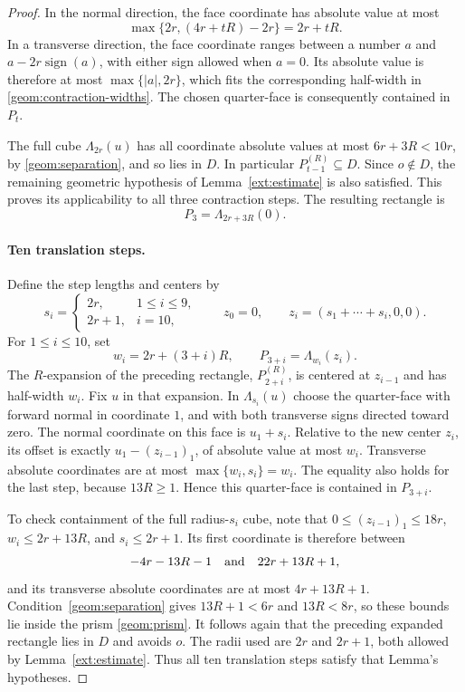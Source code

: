 \begin{proof}
In the normal direction, the face coordinate has absolute value at most
\[
  \max\{2r,(4r+tR)-2r\}=2r+tR.
\]
In a transverse direction, the face coordinate ranges between a number $a$
and $a-2r\operatorname{sign}(a)$, with either sign allowed when $a=0$.
Its absolute value is therefore at most $\max\{|a|,2r\}$, which fits the
corresponding half-width in \eqref{geom:contraction-widths}. The chosen
quarter-face is consequently contained in $P_t$.

The full cube $\Lambda_{2r}(u)$ has all coordinate absolute values at most
$6r+3R<10r$, by \eqref{geom:separation}, and so lies in $D$. In particular
$P_{t-1}^{(R)}\subseteq D$. Since $o\notin D$, the remaining geometric
hypothesis of Lemma~\ref{ext:estimate} is also satisfied. This proves its
applicability to all three contraction steps. The resulting rectangle is
\begin{equation}\label{geom:contracted}
  P_3=\Lambda_{2r+3R}(0).
\end{equation}

\paragraph{Ten translation steps.}
Define the step lengths and centers by
\begin{equation}\label{geom:translations}
  s_i=\begin{cases}2r,&1\le i\le9,\\2r+1,&i=10,\end{cases}
  \qquad
  z_0=0,\qquad z_i=(s_1+\cdots+s_i,0,0).
\end{equation}
For $1\le i\le10$, set
\begin{equation}\label{geom:translated-boxes}
  w_i=2r+(3+i)R,\qquad P_{3+i}=\Lambda_{w_i}(z_i).
\end{equation}
The $R$-expansion of the preceding rectangle, $P_{2+i}^{(R)}$, is centered
at $z_{i-1}$ and has half-width $w_i$. Fix $u$ in that expansion. In
$\Lambda_{s_i}(u)$ choose the quarter-face with forward normal in coordinate
$1$, and with both transverse signs directed toward zero. The normal
coordinate on this face is $u_1+s_i$. Relative to the new center $z_i$, its
offset is exactly $u_1-(z_{i-1})_1$, of absolute value at most $w_i$.
Transverse absolute coordinates are at most
$\max\{w_i,s_i\}=w_i$. The equality also holds for the last step, because
$13R\ge1$. Hence this quarter-face is contained in $P_{3+i}$.

To check containment of the full radius-$s_i$ cube, note that
$0\le(z_{i-1})_1\le18r$, $w_i\le2r+13R$, and $s_i\le2r+1$. Its first
coordinate is therefore between
\begin{equation}\label{geom:translation-bounds}
  -4r-13R-1\quad\hbox{and}\quad22r+13R+1,
\end{equation}
and its transverse absolute coordinates are at most $4r+13R+1$.
Condition~\eqref{geom:separation} gives $13R+1<6r$ and $13R<8r$, so these
bounds lie inside the prism \eqref{geom:prism}. It follows again that the
preceding expanded rectangle lies in $D$ and avoids $o$. The radii used
are $2r$ and $2r+1$, both allowed by Lemma~\ref{ext:estimate}. Thus all ten
translation steps satisfy that Lemma's hypotheses.


\end{proof}
